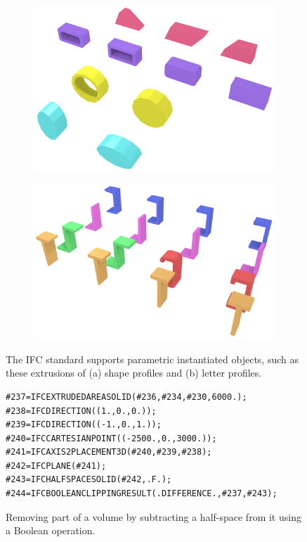 \begin{figure}
\centering
\begin{subfigure}[b]{0.45\linewidth}
	\includegraphics[width=\linewidth]{figs/profiles}%
	\label{subfig:profiles}
\end{subfigure}
\quad
\begin{subfigure}[b]{0.45\linewidth}
	\includegraphics[width=\linewidth]{figs/letter_profiles}%
	\label{subfig:letter-profiles}
\end{subfigure}
\caption{The IFC standard supports parametric instantiated objects, such as these extrusions of (a) shape profiles and (b) letter profiles.}%
\label{fig:profiles}
\end{figure}

\begin{figure}
\begin{lstlisting}[frame=single]
#237=IFCEXTRUDEDAREASOLID(#236,#234,#230,6000.);
#238=IFCDIRECTION((1.,0.,0.));
#239=IFCDIRECTION((-1.,0.,1.));
#240=IFCCARTESIANPOINT((-2500.,0.,3000.));
#241=IFCAXIS2PLACEMENT3D(#240,#239,#238);
#242=IFCPLANE(#241);
#243=IFCHALFSPACESOLID(#242,.F.);
#244=IFCBOOLEANCLIPPINGRESULT(.DIFFERENCE.,#237,#243);
\end{lstlisting}
\caption{Removing part of a volume by subtracting a half-space from it using a Boolean operation.}%
\label{fig:csg}
\end{figure}

